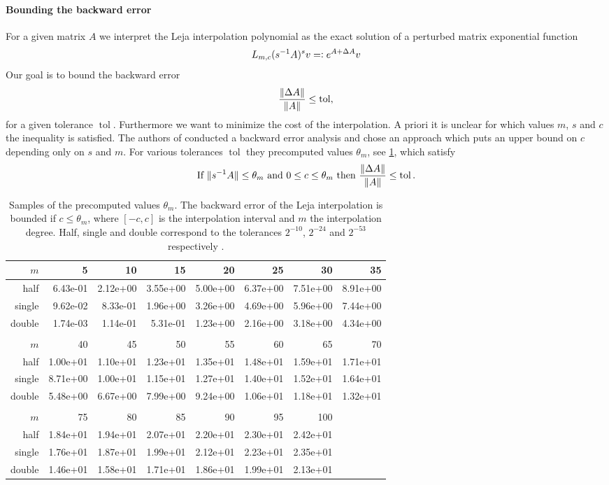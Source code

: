 \documentclass{scrartcl}
\newcommand{\eqdefn}{=\mathrel{\mathop:}}
\begin{document}
	\paragraph{Bounding the backward error} For a given matrix $A$ we interpret the Leja interpolation polynomial as the exact solution of a perturbed matrix exponential function
	\[
	L_{m,c}(s^{-1}A)^sv \eqdefn e^{A + \Delta A}v\\
	\]
	Our goal is to bound the backward error 
	\[
	\frac{\lVert\Delta A\rVert}{\lVert A\rVert} \le \operatorname{tol}, 
	\]
	for a given tolerance $\operatorname{tol}$. Furthermore we want to minimize the cost of the interpolation. A priori it is unclear for which values $m$, $s$ and $c$ the inequality is satisfied. The authors of \cite{lejarev} conducted a backward error analysis and chose an approach which puts an upper bound on $c$ depending only on $s$ and $m$. For various tolerances $\operatorname{tol}$ they precomputed values $\theta_m$, see \ref{table:thetam}, which satisfy
	\[
	\text{If}\ \norm{s^{-1}A}\le \theta_m\ \text{and}\ 0 \le c \le \theta_m\ \text{then}\ \frac{\norm{\Delta A}}{\norm{A}} \le \operatorname{tol}.
	\]
	\begin{table}[tbp]
		\begin{tabular}{r|rrrrrrr}
			$m$ &        5 &       10 &       15 &       20 &       25 &       30 &       35 \\\hline
			half & 6.43e-01 & 2.12e+00 & 3.55e+00 & 5.00e+00 & 6.37e+00 & 7.51e+00 & 8.91e+00 \\
			single & 9.62e-02 & 8.33e-01 & 1.96e+00 & 3.26e+00 & 4.69e+00 & 5.96e+00 & 7.44e+00 \\
			double & 1.74e-03 & 1.14e-01 & 5.31e-01 & 1.23e+00 & 2.16e+00 & 3.18e+00 & 4.34e+00 \\
			\\
			$m$ &       40 &       45 &       50 &       55 &       60 &       65 &       70 \\\hline
			half & 1.00e+01 & 1.10e+01 & 1.23e+01 & 1.35e+01 & 1.48e+01 & 1.59e+01 & 1.71e+01 \\
			single & 8.71e+00 & 1.00e+01 & 1.15e+01 & 1.27e+01 & 1.40e+01 & 1.52e+01 & 1.64e+01 \\
			double & 5.48e+00 & 6.67e+00 & 7.99e+00 & 9.24e+00 & 1.06e+01 & 1.18e+01 & 1.32e+01 \\
			\\
			$m$ &       75 &       80 &       85 &       90 &       95 &      100 \\ \hline
			half & 1.84e+01 & 1.94e+01 & 2.07e+01 & 2.20e+01 & 2.30e+01 & 2.42e+01 \\
			single & 1.76e+01 & 1.87e+01 & 1.99e+01 & 2.12e+01 & 2.23e+01 & 2.35e+01 \\
			double & 1.46e+01 & 1.58e+01 & 1.71e+01 & 1.86e+01 & 1.99e+01 & 2.13e+01
		\end{tabular}
		\caption{Samples of the precomputed values $\theta_m$. The backward error of the Leja interpolation is bounded if $c\le\theta_m$, where $[-c,c]$ is the interpolation interval and $m$ the interpolation degree. Half, single and double correspond to the tolerances $2^{-10}$, $2^{-24}$ and $2^{-53}$ respectively \cite[Table 1]{lejarev}.}
		\label{table:thetam}
	\end{table}	
\end{document}
